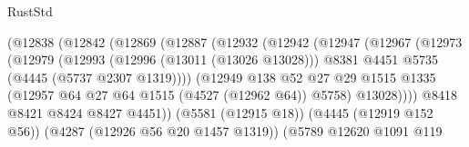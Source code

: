 \begin{lexlean}{RustStd}
\begin{coremodule}
                                    (@12838
                                      (@12842
                                        (@12869
                                          (@12887
                                            (@12932
                                              (@12942
                                                (@12947
                                                  (@12967
                                                    (@12973
                                                      (@12979
                                                        (@12993
                                                          (@12996 (@13011 (@13026 @13028)))
                                                          @8381
                                                          @4451
                                                          @5735
                                                          (@4445 (@5737 @2307 @1319))))
                                                      (@12949
                                                        @138
                                                        @52
                                                        @27
                                                        @29
                                                        @1515
                                                        @1335
                                                        (@12957
                                                          @64
                                                          @27
                                                          @64
                                                          @1515
                                                          (@4527 (@12962 @64))
                                                          @5758)
                                                        @13028))))
                                                @8418
                                                @8421
                                                @8424
                                                @8427
                                                @4451))
                                            (@5581 (@12915 @18))
                                            (@4445 (@12919 @152 @56))
                                            (@4287 (@12926 @56 @20 @1457 @1319))
                                            (@5789
                                              @12620
                                              @1091
                                              @119

\end{coremodule}
\end{lexlean}
